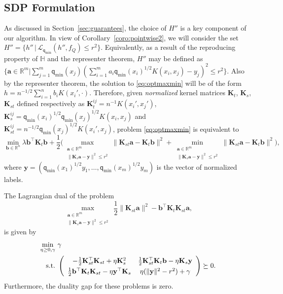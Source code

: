 \documentclass[twoside,11pt]{article}
\def\Rset{\mathbb{R}}
\def\Hset{\mathbb{H}}
\newcommand{\set}[1]{\{#1\}}
\newcommand{\cL}{{\mathcal L}}
\newcommand{\mat}[1]{{\mathbf #1}}
\renewcommand{\a}{\mat{a}}
\renewcommand{\b}{\mat{b}}
\newcommand{\1}{\mat{1}}
\newcommand{\Ks}{\mat{K}_s}
\newcommand{\Kst}{\mat{K}_{st}}
\newcommand{\Kt}{\mat{K}_{t}}
\newcommand{\y}{\mat{y}}
\newcommand{\qq}{{\mathsf q}}
\newcommand{\qmin}{{\qq_\text{min}}}
\begin{document}
\subsection{SDP Formulation}
\label{sec:sdp}

As discussed in Section~\ref{sec:guarantees}, the choice of $H''$ is a
key component of our algorithm. In view of
Corollary~\ref{coro:pointwise2}, we will consider the set
$ H'' = \set{ h'' \,|\, \cL_{\qmin}(h'', f_Q) \leq r^2 }$. Equivalently, as a
result of the reproducing property of $\Hset$ and the representer
theorem, $H''$ may be defined as
$\{ \a \in \Rset^m | \sum_{j=1}^m \qmin(x_j)(\sum_{i=1}^m a_i
\qmin(x_i)^{1/2}K(x_i, x_j) - y_j)^2 \leq r^2\}$. Also by the
representer theorem, the solution to \eqref{eq:optmaxmin} will be of
the form $h = n^{-1/2}\sum_{i=1}^n b_i K(x_i', \cdot)$. Therefore,
given \emph{normalized} kernel matrices $\Kt$, $\Ks$, $\Kst$ defined
respectively as
$\Kt^{ij} = n^{-1} K(x_i', x_j')$, $\Ks^{ij} = \qmin(x_i)^{1/2}
\qmin(x_j)^{1/2} K(x_i, x_j)$ and
$\Kst^{ij} = n^{-1/2} \qmin(x_j)^{1/2} K(x_i', x_j)$, problem
\eqref{eq:optmaxmin} is equivalent to
\begin{equation}
\label{eq:kmaxmin}
\min_{\b \in \Rset^n} \lambda \b^\top \Kt \b + \frac{1}{2}
\bigg(\max_{\substack{\a \in \Rset^m \\ \|\Ks \a - \y\|^2 \leq r^2}}
\|\Kst \a - \Kt \b\|^2 + \min_{\substack{\a \in \Rset^m \\ \|\Ks \a -
\y\|^2 \leq r^2}} \|\Kst \a - \Kt \b\|^2 \bigg),
\end{equation}
where $\y = (\qmin(x_1)^{1/2}y_1, \ldots, \qmin(x_m)^{1/2} y_m)$ is
the vector of normalized labels.

\begin{lemma}
\label{lemma:sdpdual}
The Lagrangian dual of the problem
\begin{equation*}
 \max_{\substack{\a \in \Rset^m \\ \|\Ks \a - \y\|^2 \leq r^2}}
 \ \frac{1}{2}\|\Kst \a\|^2 - \b^\top \Kt \Kst \a,
\end{equation*}
is given by
\begin{align*}
\min_{\eta \geq 0, \gamma} & \ \gamma \\
\text{s.t.} & \ \left(
\def\arraystretch{1.3}
\begin{array}{cc}
 -\frac{1}{2} \Kst^\top \Kst + \eta \Ks^2
& \frac{1}{2}\Kst^\top \Kt \b - \eta \Ks\y  \\
\frac{1}{2} \b^\top  \Kt \Kst - \eta \y^\top \Ks
&  \eta (\|\y\|^2 - r^2) + \gamma
\end{array}
\right) \succeq  0.
\end{align*}
Furthermore, the duality gap for these problems is zero.
\end{lemma}
\end{document}
